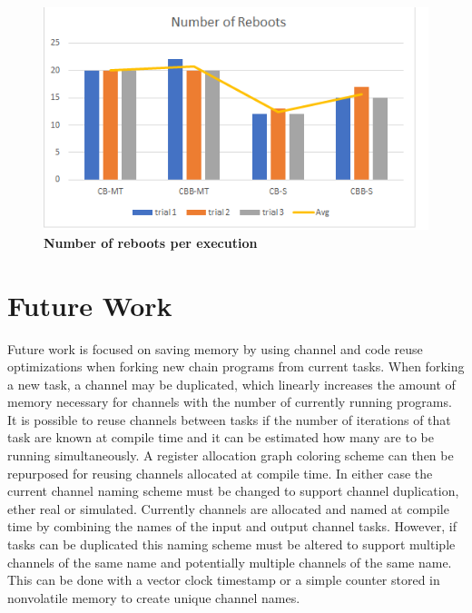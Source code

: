 \documentclass[11pt]{sensys-proc}
\begin{document}
\begin{figure}[h]
  \centering
  \includegraphics[width=0.99\columnwidth]{figs/reboots}
  \caption{{\bf Number of reboots per execution}}
  \label{fig:reboots}
\end{figure}


\section{Future Work}
Future work is focused on saving memory by using channel and code reuse
optimizations when forking new chain programs from current tasks.  When forking
a new task, a channel may be duplicated, which linearly increases the amount of
memory necessary for channels with the number of currently running programs.  It
is possible to reuse channels between tasks if the number of iterations of that
task are known at compile time and it can be estimated how many are to be
running simultaneously. A register allocation graph coloring scheme can then be
repurposed for reusing channels allocated at compile time.  In either case the
current channel naming scheme must be changed to support channel duplication,
ether real or simulated.  Currently channels are allocated and named at compile
time by combining the names of the input and output channel tasks.  However, if
tasks can be duplicated this naming scheme must be altered to support multiple
channels of the same name and potentially multiple channels of the same name.
This can be done with a vector clock timestamp or a simple counter stored in
nonvolatile memory to create unique channel names.
\end{document}
